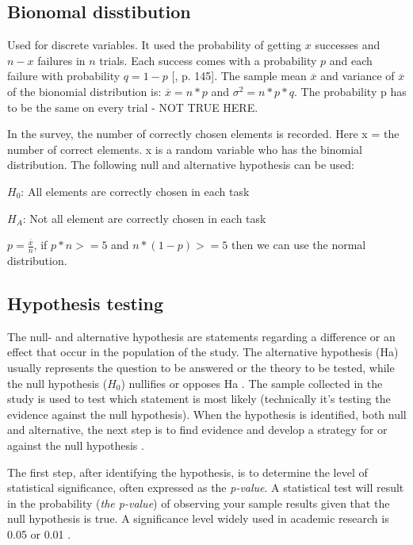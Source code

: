 \subsection{Bionomal disstibution}
Used for discrete variables. It used the probability of getting $x$ successes and $n-x$ failures in $n$ trials. Each success comes with a probability $p$ and each failure with probability $q=1-p$  [\citep{Walpole2012}, p. 145]. The sample mean $\overline{x}$ and variance of $\overline{x}$ of the bionomial distribution is: $\overline{x} = n * p$ and $\sigma^{2} = n*p*q$. The probability p has to be the same on every trial - NOT TRUE HERE.

In the survey, the number of correctly chosen elements is recorded. Here x = the number of correct elements. x is a random variable who has the binomial distribution. The following null and alternative hypothesis can be used:

\centerline{$H_{0}$: All elements are correctly chosen in each task} 
\centerline{$H_{A}$: Not all element are correctly chosen in each task}

$p=\frac{\overline{x}}{n}$, if $p*n >= 5$ and $n*(1-p) > = 5$ then we can use the normal distribution. 

\subsection{Hypothesis testing}\label{sec:hypothesistesting}
The null- and alternative hypothesis are statements regarding a difference or an effect that occur in the population of the study. The alternative hypothesis (Ha) usually represents the question to be answered or the theory to be tested, while the null hypothesis ($H_{0}$) nullifies or opposes Ha \citep{Walpole2012}. The sample collected in the study is used to test which statement is most likely (technically it's testing the evidence against the null hypothesis).  When the hypothesis is identified, both null and alternative, the next step is to find evidence and develop a strategy for or against the null hypothesis \citep{LundResearchLtd2013}.

The first step, after identifying the hypothesis, is to determine the level of statistical significance, often expressed as the \textit{p-value}. A statistical test will result in the probability (\textit{the p-value}) of observing your sample results given that the null hypothesis is true. A significance level widely used in academic research is 0.05 or 0.01 \citep{Walpole2012}. 

